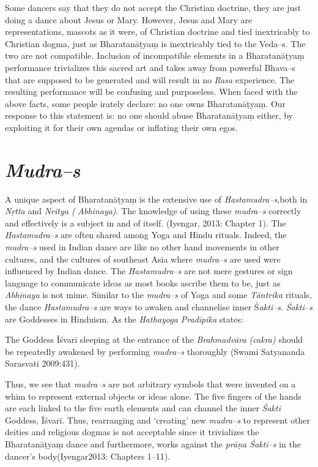 Some dancers say that they do not accept the Christian doctrine, they are just doing a dance about Jesus or Mary. However, Jesus and Mary are representations, mascots as it were, of Christian doctrine and tied inextricably to Christian dogma, just as Bharatanāṭyaṃ is inextricably tied to the Veda–s. The two are not compatible. Inclusion of incompatible elements in a Bharatanāṭyaṃ performance trivializes this sacred art and takes away from powerful Bhava–s that are supposed to be generated and will result in no \textit{Rasa} experience. The resulting performance will be confusing and purposeless. When faced with the above facts, some people irately declare: no one owns Bharatanāṭyaṃ. Our response to this statement is: no one should abuse Bharatanāṭyaṃ either, by exploiting it for their own agendas or inflating their own egos.


\section*{\textit{Mudra–s}}

A unique aspect of Bharatanāṭyaṃ is the extensive use of \textit{Hastamudra–s,}\break both in \textit{Nṛtta }and \textit{Nritya (} \textit{Abhinaya)}. The knowledge of using these \textit{mudra–s }correctly and effectively is a subject in and of itself. (Iyengar, 2013: Chapter 1). The \textit{Hastamudra–s} are often shared among Yoga and Hindu rituals. Indeed, the \textit{mudra–s} used in Indian dance are like no other hand movements in other cultures, and the cultures of southeast Asia where \textit{mudra–s }are used were influenced by Indian dance. The \textit{Hastamudra–s }are not mere gestures or sign language to communicate ideas as most books ascribe them to be, just as \textit{Abhinaya }is not mime. Similar to the \textit{mudra–s }of Yoga and some \textit{Tāntrika} rituals, the dance \textit{Hastamudra–s} are ways to awaken and channelise inner Ś\textit{akti–s}. \textit{Śakti–s} are Goddesses in Hinduism. As the \textit{Hathayoga Pradīpika} states:

The Goddess Īśvarī sleeping at the entrance of the \textit{Brahmadvāra (cakra)} should be repeatedly awakened by performing \textit{mudra–s} thoroughly (Swami Satyananda Sarasvati 2009:431).

Thus, we see that \textit{mudra–s }are not arbitrary symbols that were invented on a whim to represent external objects or ideas alone. The five fingers of the hands are each linked to the five earth elements and can channel the inner \textit{Śakti} Goddess, Īśvarī. Thus, rearranging and ‘creating’ new \textit{mudra–s }to represent other deities and religious dogmas is not acceptable since it trivializes the Bharatanāṭyaṃ dance and furthermore, works against the \textit{prāṇa Śakti–s} in the dancer’s body(Iyengar2013: Chapters 1–11).

